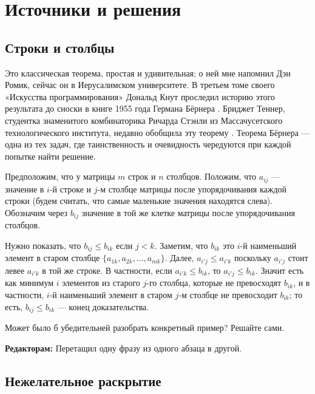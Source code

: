 \section*{Источники и решения}

\subsection*{Строки и столбцы}

Это классическая теорема, простая и удивительная; о ней мне напомнил Дэн Ромик, сейчас он в Иерусалимском университете.
В третьем томе своего «Искусства программирования» \cite{knut} Дональд Кнут проследил историю этого результата до сноски в книге 1955 года Германа Бёрнера \cite{boerner}.
Бриджет Теннер, студентка знаменитого комбинаторика Ричарда Стэнли из Массачусетского технологического института, недавно обобщила эту теорему \cite{tenner}.
Теорема Бёрнера --- одна из тех задач, где таинственность и очевидность чередуются при каждой попытке найти решение.

Предположим, что у матрицы $m$ строк и $n$ столбцов.
Положим, что $a_{ij}$ --- значение в $i$-й строке и $j$-м столбце матрицы
после упорядочивания каждой строки (будем считать, что самые маленькие значения находятся слева).
Обозначим через $b_{ij}$ значение в той же клетке матрицы после упорядочивания столбцов.

Нужно показать, что $b_{ij} \le b_{ik}$ если $j < k$.
Заметим, что $b_{ik}$ это $i$-й наименьший элемент в старом столбце $\{a_{1k}, a_{2k}, \dots, a_{mk}\}$.
Далее, $a_{i'j}\le a_{i'k}$ поскольку $a_{i'j}$ стоит левее $a_{i'k}$ в той же строке.
В частности, если $a_{i'k}\le b_{ik}$, то $a_{i'j}\le b_{ik}$.
Значит есть как минимум $i$ элементов из старого $j$-го столбца, которые не превосходят $b_{ik}$,
и в частности, $i$-й наименьший элемент в старом $j$-м столбце не превосходит $b_{ik}$;
то есть, $b_{ij} \le b_{ik}$ --- конец доказательства.

Может было б убедительней разобрать конкретный пример?
Решайте сами.


\begin{addedbytheeditors}
\textbf{Редакторам:} Перетащил одну фразу из одного абзаца в другой.
\end{addedbytheeditors}

\subsection*{Нежелательное раскрытие}

